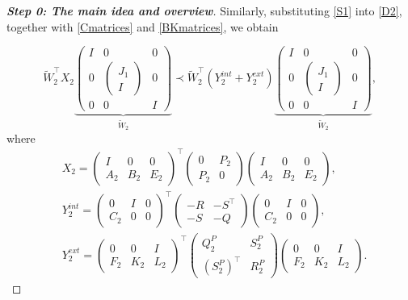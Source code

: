 \documentclass[11pt,a4paper,oneside,DIV=12,headings=small]{scrartcl}
\theoremstyle{plain}
\begin{document}
\begin{proof}[\textbf{Step 0: \textit{The main idea and overview}}]
Similarly, substituting \eqref{S1} into \eqref{D2}, together with \eqref{Cmatrices} and \eqref{BKmatrices}, we obtain

\begin{equation}
\label{D2A}
\tilde{W}_2^\top
X_2
\underbrace{\begin{pmatrix} I & 0 & 0 \\ 0 & \begin{pmatrix} J_1 \\ I \end{pmatrix} & 0 \\ 0 & 0 & I \end{pmatrix}}_{\tilde{W}_2}\prec
\tilde{W}_2^\top
(Y_2^{int}+Y_2^{ext})
\underbrace{\begin{pmatrix} I & 0 & 0 \\ 0 & \begin{pmatrix} J_1 \\ I \end{pmatrix} & 0 \\ 0 & 0 & I \end{pmatrix}}_{\tilde{W}_2}, 
\end{equation}
where
\begin{align}
&X_2= \begin{pmatrix} I & 0  & 0 \\ A_2 & B_2 & E_2  \end{pmatrix}^\top
\begin{pmatrix} 0 & P_2 \\ P_2 & 0 \end{pmatrix} 
\begin{pmatrix} I & 0  & 0 \\ A_2 & B_2 & E_2  \end{pmatrix},\\
&Y_2^{int}=\begin{pmatrix} 0 & I & 0 \\ C_2 & 0 & 0  \end{pmatrix}^\top
\begin{pmatrix} -R & -S^\top \\ -S & -Q \end{pmatrix}
\begin{pmatrix} 0 & I & 0 \\ C_2 & 0 & 0  \end{pmatrix}, \\
&Y_2^{ext}=\begin{pmatrix} 0 & 0 & I \\ F_2 & K_2 & L_2  \end{pmatrix}^\top
\begin{pmatrix} Q^P_2 & S^P_2 \\ (S^P_2)^\top & R^P_2 \end{pmatrix}
\begin{pmatrix} 0 & 0 & I \\ F_2 & K_2 & L_2  \end{pmatrix}.
\end{align}


\end{proof}
\end{document}
